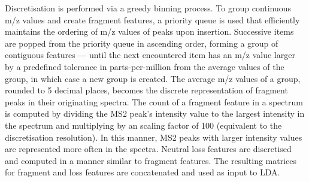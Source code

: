 Discretisation is performed via a greedy binning process. To group continuous m/z values and create fragment features, a priority queue is used that efficiently maintains the ordering of m/z values of peaks upon insertion. Successive items are popped from the priority queue in ascending order, forming a group of contiguous features --- until the next encountered item has an m/z value larger by a predefined tolerance in parts-per-million from the average values of the group, in which case a new group is created. The average m/z values of a group, rounded to 5 decimal places, becomes the discrete representation of fragment peaks in their originating spectra. The count of a fragment feature in a spectrum is computed by dividing the MS2 peak's intensity value to the largest intensity in the spectrum and multiplying by an scaling factor of 100 (equivalent to the discretisation resolution). In this manner, MS2 peaks with larger intensity values are represented more often in the spectra. Neutral loss features are discretised and computed in a manner similar to fragment features. The resulting matrices for fragment and loss features are concatenated and used as input to LDA. %

